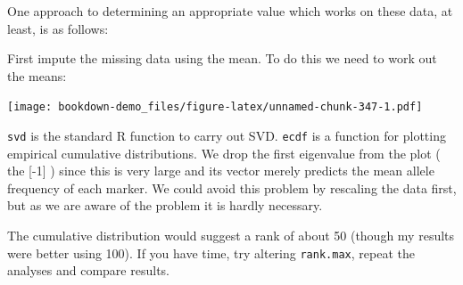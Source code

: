 \documentclass[
]{book}
\newenvironment{Shaded}{\begin{snugshade}}{\end{snugshade}}
\newcommand{\AttributeTok}[1]{\textcolor[rgb]{0.77,0.63,0.00}{#1}}
\newcommand{\CommentTok}[1]{\textcolor[rgb]{0.56,0.35,0.01}{\textit{#1}}}
\newcommand{\ControlFlowTok}[1]{\textcolor[rgb]{0.13,0.29,0.53}{\textbf{#1}}}
\newcommand{\DecValTok}[1]{\textcolor[rgb]{0.00,0.00,0.81}{#1}}
\newcommand{\FloatTok}[1]{\textcolor[rgb]{0.00,0.00,0.81}{#1}}
\newcommand{\FunctionTok}[1]{\textcolor[rgb]{0.00,0.00,0.00}{#1}}
\newcommand{\NormalTok}[1]{#1}
\newcommand{\OtherTok}[1]{\textcolor[rgb]{0.56,0.35,0.01}{#1}}
\newcommand{\SpecialCharTok}[1]{\textcolor[rgb]{0.00,0.00,0.00}{#1}}
\begin{document}
One approach to determining an appropriate value which works on these data, at least, is as follows:

First impute the missing data using the mean. To do this we need to work out the means:

\begin{Shaded}
\end{Shaded}

\texttt{[image: bookdown-demo\_files/figure-latex/unnamed-chunk-347-1.pdf]}

\texttt{svd} is the standard R function to carry out SVD. \texttt{ecdf} is a function for plotting empirical cumulative distributions. We drop the first eigenvalue from the plot ( the {[}-1{]} ) since this is very large and its vector merely predicts the mean allele frequency of each marker. We could avoid this problem by rescaling the data first, but as we are aware of the problem it is hardly necessary.

The cumulative distribution would suggest a rank of about 50 (though my results were better using 100). If you have time, try altering \texttt{rank.max}, repeat the analyses and compare results.
\end{document}
